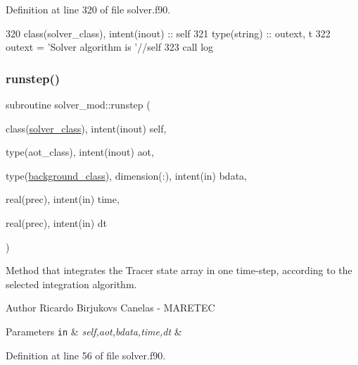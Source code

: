 Definition at line 320 of file solver.\+f90.


\begin{DoxyCode}
320     \textcolor{keywordtype}{class}(solver\_class), \textcolor{keywordtype}{intent(inout)} :: self
321     \textcolor{keywordtype}{type}(string) :: outext, t
322     outext = \textcolor{stringliteral}{'Solver algorithm is '}//self%
323     \textcolor{keyword}{call }log%
\end{DoxyCode}
\mbox{\label{namespacesolver__mod_ab87d71c6c8aa1709901ec14f9bf12505}} 
\subsubsection{\texorpdfstring{runstep()}{runstep()}}
{\footnotesize\ttfamily subroutine solver\+\_\+mod\+::runstep (\begin{DoxyParamCaption}\item[{class(\mbox{\hyperlink{structsolver__mod_1_1solver__class}{solver\+\_\+class}}), intent(inout)}]{self,  }\item[{type(aot\+\_\+class), intent(inout)}]{aot,  }\item[{type(\mbox{\hyperlink{structbackground__mod_1_1background__class}{background\+\_\+class}}), dimension(\+:), intent(in)}]{bdata,  }\item[{real(prec), intent(in)}]{time,  }\item[{real(prec), intent(in)}]{dt }\end{DoxyParamCaption})\hspace{0.3cm}{\ttfamily [private]}}



Method that integrates the Tracer state array in one time-\/step, according to the selected integration algorithm. 

\begin{DoxyAuthor}{Author}
Ricardo Birjukovs Canelas -\/ M\+A\+R\+E\+T\+EC 
\end{DoxyAuthor}

\begin{DoxyParams}[1]{Parameters}
\mbox{\tt in}  & {\em self,aot,bdata,time,dt} & \\
\hline
\end{DoxyParams}


Definition at line 56 of file solver.\+f90.



